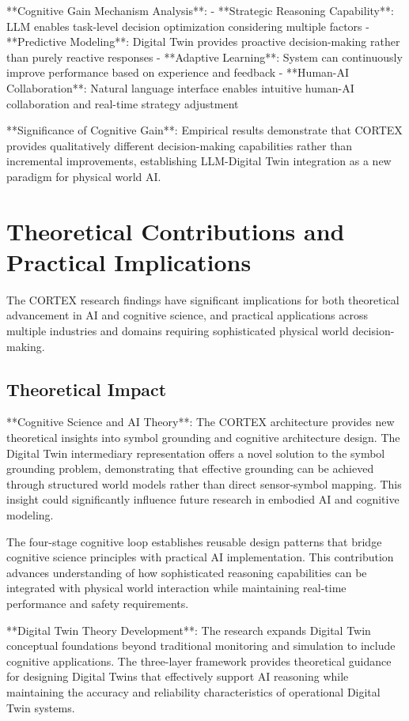 **Cognitive Gain Mechanism Analysis**:
- **Strategic Reasoning Capability**: LLM enables task-level decision optimization considering multiple factors
- **Predictive Modeling**: Digital Twin provides proactive decision-making rather than purely reactive responses
- **Adaptive Learning**: System can continuously improve performance based on experience and feedback
- **Human-AI Collaboration**: Natural language interface enables intuitive human-AI collaboration and real-time strategy adjustment

**Significance of Cognitive Gain**: Empirical results demonstrate that CORTEX provides qualitatively different decision-making capabilities rather than incremental improvements, establishing LLM-Digital Twin integration as a new paradigm for physical world AI.

\section{Theoretical Contributions and Practical Implications}

The CORTEX research findings have significant implications for both theoretical advancement in AI and cognitive science, and practical applications across multiple industries and domains requiring sophisticated physical world decision-making.

\subsection{Theoretical Impact}

**Cognitive Science and AI Theory**:
The CORTEX architecture provides new theoretical insights into symbol grounding and cognitive architecture design. The Digital Twin intermediary representation offers a novel solution to the symbol grounding problem, demonstrating that effective grounding can be achieved through structured world models rather than direct sensor-symbol mapping. This insight could significantly influence future research in embodied AI and cognitive modeling.

The four-stage cognitive loop establishes reusable design patterns that bridge cognitive science principles with practical AI implementation. This contribution advances understanding of how sophisticated reasoning capabilities can be integrated with physical world interaction while maintaining real-time performance and safety requirements.

**Digital Twin Theory Development**:
The research expands Digital Twin conceptual foundations beyond traditional monitoring and simulation to include cognitive applications. The three-layer framework provides theoretical guidance for designing Digital Twins that effectively support AI reasoning while maintaining the accuracy and reliability characteristics of operational Digital Twin systems.

